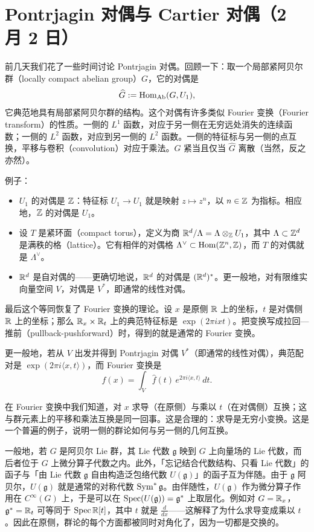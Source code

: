 \section[Pontrjagin 对偶与 Cartier 对偶]{Pontrjagin 对偶与 Cartier 对偶（2 月 2 日）}


前几天我们花了一些时间讨论 Pontrjagin 对偶。回顾一下：取一个局部紧阿贝尔群（locally compact abelian group）$G$，它的对偶是
\[
  \widehat{G} := \operatorname{Hom}_{\mathrm{Ab}}(G,U_1),
\]
它典范地具有局部紧阿贝尔群的结构。这个对偶有许多类似 Fourier 变换（Fourier transform）的性质。一侧的 $L^1$ 函数，对应于另一侧在无穷远处消失的连续函数；一侧的 $L^2$ 函数，对应到另一侧的 $L^2$ 函数。一侧的特征标与另一侧的点互换，平移与卷积（convolution）对应于乘法。$G$ 紧当且仅当 $\widehat{G}$ 离散（当然，反之亦然）。

例子：

\begin{itemize}
  \item $U_1$ 的对偶是 $\mathbb{Z}$：特征标 $U_1\to U_1$ 就是映射 $z\mapsto z^n$，以 $n\in\mathbb{Z}$ 为指标。相应地，$\mathbb{Z}$ 的对偶是 $U_1$。
  \item 设 $T$ 是紧环面（compact torus），定义为商 $\mathbb{R}^d/\Lambda = \Lambda\otimes_{\mathbb{Z}} U_1$，其中 $\Lambda\subset\mathbb{Z}^d$ 是满秩的格（lattice）。它有相伴的对偶格 $\Lambda^\vee\subset\operatorname{Hom}(\mathbb{Z}^n,\mathbb{Z})$，而 $T$ 的对偶就是 $\Lambda^\vee$。
  \item $\mathbb{R}^d$ 是自对偶的——更确切地说，$\mathbb{R}^d$ 的对偶是 $(\mathbb{R}^d)^*$。更一般地，对有限维实向量空间 $V$，对偶是 $V^*$，即通常的线性对偶。
\end{itemize}

最后这个等同恢复了 Fourier 变换的理论。设 $x$ 是原侧 $\mathbb{R}$ 上的坐标，$t$ 是对偶侧 $\mathbb{R}$ 上的坐标；那么 $\mathbb{R}_x\times\mathbb{R}_t$ 上的典范特征标是 $\exp(2\pi ixt)$。把变换写成拉回—推前（pullback-pushforward）时，得到的就是通常的 Fourier 变换。

更一般地，若从 $V$ 出发并得到 Pontrjagin 对偶 $V^*$（即通常的线性对偶），典范配对是 $\exp(2\pi i\langle x,t\rangle)$，而 Fourier 变换是
\[
  f(x) = \int_V \widehat{f}(t)\, e^{2\pi i\langle x,t\rangle}\, dt.
\]

在 Fourier 变换中我们知道，对 $x$ 求导（在原侧）与乘以 $t$（在对偶侧）互换；这与群元素上的平移和乘法互换是同一回事。这是合理的：求导是无穷小变换。这是一个普遍的例子，说明一侧的群论如何与另一侧的几何互换。

一般地，若 $G$ 是阿贝尔 Lie 群，其 Lie 代数 $\mathfrak{g}$ 映到 $G$ 上向量场的 Lie 代数，而后者位于 $G$ 上微分算子代数之内。此外，「忘记结合代数结构、只看 Lie 代数」的函子与「由 Lie 代数 $\mathfrak{g}$ 自由构造泛包络代数 $U(\mathfrak{g})$」的函子互为伴随。由于 $\mathfrak{g}$ 阿贝尔，$U(\mathfrak{g})$ 就是通常的对称代数 $\operatorname{Sym}^*\mathfrak{g}$。由伴随性，$U(\mathfrak{g})$ 作为微分算子作用在 $C^\infty(G)$ 上，于是可以在 $\operatorname{Spec}(U(\mathfrak{g})) = \mathfrak{g}^*$ 上取层化。例如对 $G = \mathbb{R}_x$，$\mathfrak{g}^* = \mathbb{R}_t$ 可等同于 $\operatorname{Spec} \mathbb{R}[t]$，其中 $t$ 就是 $\frac{d}{dx}$——这解释了为什么求导变成乘以 $t$。因此在原侧，群论的每个方面都被同时对角化了，因为一切都是交换的。

